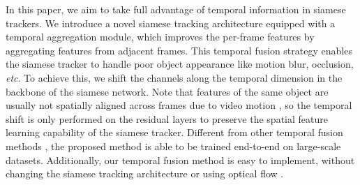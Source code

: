 \documentclass{article}
\begin{document}
In this paper, we aim to take full advantage of temporal information in siamese trackers.
We introduce a novel siamese tracking architecture equipped with a temporal aggregation module, which improves the per-frame features by aggregating features from adjacent frames.
This temporal fusion strategy enables the siamese tracker to handle poor object appearance like motion blur, occlusion, \textit{etc}.
To achieve this, we shift the channels along the temporal dimension \cite{lin2019tsm} in the backbone of the siamese network.
Note that features of the same object are usually not spatially aligned across frames due to video motion \cite{zhu2017flow}, so the temporal shift is only performed on the residual layers \cite{lin2019tsm} to preserve the spatial feature learning capability of the siamese tracker.
Different from other temporal fusion methods \cite{tao2016siamese, gladh2016deep}, the proposed method is able to be trained end-to-end on large-scale datasets.
Additionally, our temporal fusion method is easy to implement, without changing the siamese tracking architecture or using optical flow \cite{zhu2018end}.
\end{document}
